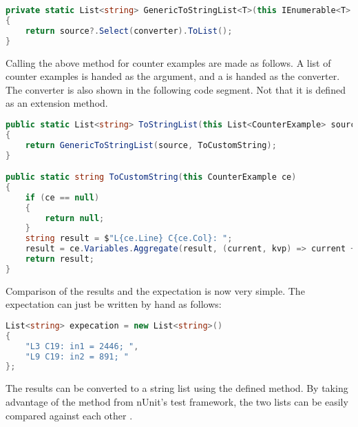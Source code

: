 \begin{lstlisting}[language=csharp, caption={Generic Method to Convert an IEnumerable}, captionpos=b, label={lst:genericconverter}]
private static List<string> GenericToStringList<T>(this IEnumerable<T> source, Func<T, string> converter)
{
    return source?.Select(converter).ToList();
}
\end{lstlisting}

Calling the above method for counter examples are made as follows. A list of counter examples is handed as the argument, and a  is handed as the converter. The converter is also shown in the following code segment. Not that it is defined as an extension method.

\begin{lstlisting}[language=csharp, caption={Converting CounterExamples to strings}, captionpos=b, label={lst:converterCEToString}]
public static List<string> ToStringList(this List<CounterExample> source)
{
    return GenericToStringList(source, ToCustomString);
}

public static string ToCustomString(this CounterExample ce)
{
    if (ce == null)
    {
        return null;
    }
    string result = $"L{ce.Line} C{ce.Col}: ";
    result = ce.Variables.Aggregate(result, (current, kvp) => current + $"{kvp.Key} = {kvp.Value}; ");
    return result;
}
\end{lstlisting}

Comparison of the results and the expectation is now very simple. The expectation can just be written by hand as follows:

\begin{lstlisting}[language=csharp, caption={Expectation}, captionpos=b, label={lst:testexpectation}]
List<string> expecation = new List<string>()
{
    "L3 C19: in1 = 2446; ",
    "L9 C19: in2 = 891; "
};
\end{lstlisting}

The results can be converted to a string list using the defined  method. By taking advantage of the method  from nUnit's test framework, the two lists can be easily compared against each other \cite{nunitCollectionAssert}.


